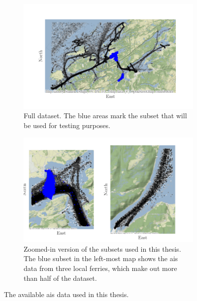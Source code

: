 \begin{figure}
    \centering
    \begin{subfigure}{\textwidth}
        \centering
        \includegraphics{figures/ais_map.pdf}
        \caption{Full dataset. The blue areas mark the subset that will be used for testing purposes.}
    \end{subfigure}
    \begin{subfigure}{\textwidth}
        \centering
        \includegraphics{figures/ais_map_zoom.pdf}
        \caption{Zoomed-in version of the subsets used in this thesis. The blue subset in the left-most map shows the \acrshort{ais} data from three local ferries, which make out more than half of the dataset.}
    \end{subfigure}
    \caption{The available \acrshort{ais} data used in this thesis. }
    \label{fig:ais_data}
\end{figure}

